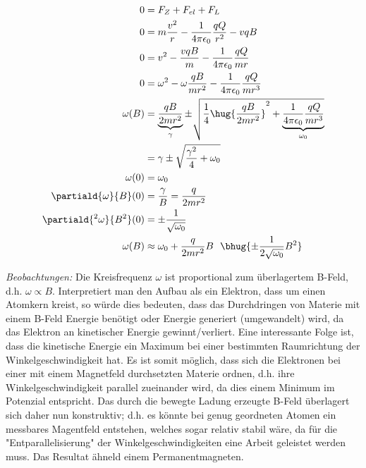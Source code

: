 \documentclass[11pt]{article}
\begin{document}
\subsection{}
\begin{align*}
    0 &= F_{Z} + F_{el} + F_{L}\\
    0 &= m \frac{v^2}{r} -\frac{1}{4\pi \epsilon_0}\frac{q Q}{r^2} - v q B \\
    0 &= v^2 - \frac{v q B}{m} -\frac{1}{4\pi \epsilon_0}\frac{q Q}{m r} \\
    0 &= \omega^2 - \omega\frac{ q B}{m r^2} -\frac{1}{4\pi \epsilon_0}\frac{q Q}{m r^3} \\
    \omega(B) &= \underbrace{\frac{ q B}{2 m r^2}}_{\gamma} \pm\sqrt{\frac{1}{4} \hug{\frac{ q B}{2 m r^2}}^2 + \underbrace{\frac{1}{4\pi \epsilon_0}\frac{q Q}{m r^3}}_{\omega_0}} \\
    &= \gamma \pm\sqrt{\frac{\gamma^2}{4} + \omega_0} \\
    \omega(0) &=  \omega_0\\
    \partiald{\omega}{B}(0) &= \frac\gamma B = \frac{ q}{2 m r^2}\\
    \partiald{^2\omega}{B^2}(0) &= \pm\frac{1}{\sqrt{\omega_0}}\\
    \omega(B) &\approx \omega_0 + \frac{ q}{2 m r^2} B
     \ \ \bhug{\pm\frac{1}{2\sqrt{\omega_0}}B^2 }
\end{align*}
\begin{adjustwidth}{20pt}{}
    \emph{Beobachtungen:} Die Kreisfrequenz \(\omega\) ist proportional 
    zum überlagertem B-Feld, d.h. \(\omega \propto B\). Interpretiert man den
    Aufbau als ein Elektron, dass um einen Atomkern kreist, so würde dies bedeuten,
    dass das Durchdringen von Materie mit einem B-Feld Energie benötigt oder Energie generiert (umgewandelt) wird, 
    da das Elektron an kinetischer Energie gewinnt/verliert.
    Eine interessante Folge ist, dass die kinetische Energie ein Maximum bei einer bestimmten 
    Raumrichtung der Winkelgeschwindigkeit hat. Es ist somit möglich, dass sich die Elektronen bei einer
    mit einem Magnetfeld durchsetzten Materie ordnen, d.h. ihre Winkelgeschwindigkeit parallel zueinander wird,
    da dies einem Minimum im Potenzial entspricht. Das durch die bewegte Ladung 
    erzeugte B-Feld überlagert sich daher nun konstruktiv; d.h. es könnte bei genug 
    geordneten Atomen ein messbares Magentfeld entstehen, welches sogar relativ stabil wäre,
    da für die "Entparallelisierung" der Winkelgeschwindigkeiten eine Arbeit geleistet 
    werden muss. Das Resultat ähneld einem Permanentmagneten.
\end{adjustwidth}
\end{document}
